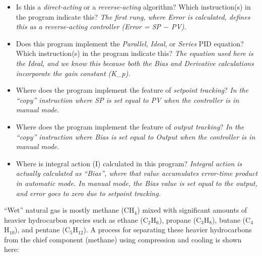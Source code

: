 \begin{itemize}
\item{} Is this a {\it direct-acting} or a {\it reverse-acting} algorithm?  Which instruction(s) in the program indicate this? {\it The first rung, where Error is calculated, defines this as a reverse-acting controller (Error = SP $-$ PV).}
\vskip 10pt
\item{} Does this program implement the {\it Parallel}, {\it Ideal}, or {\it Series} PID equation?  Which instruction(s) in the program indicate this?  {\it The equation used here is the Ideal, and we know this because both the Bias and Derivative calculations incorporate the gain constant (K\_p).}
\vskip 10pt
\item{} Where does the program implement the feature of {\it setpoint tracking}?  {\it In the ``copy'' instruction where SP is set equal to PV when the controller is in manual mode.}
\vskip 10pt
\item{} Where does the program implement the feature of {\it output tracking}?  {\it In the ``copy'' instruction where Bias is set equal to Output when the controller is in manual mode.}
\vskip 10pt
\item{} Where is integral action (I) calculated in this program?  {\it Integral action is actually calculated as ``Bias'', where that value accumulates error-time product in automatic mode.  In manual mode, the Bias value is set equal to the output, and error goes to zero due to setpoint tracking.}
\end{itemize}






``Wet'' natural gas is mostly methane (CH$_{4}$) mixed with significant amounts of heavier hydrocarbon species such as ethane (C$_{2}$H$_{6}$), propane (C$_{3}$H$_{8}$), butane (C$_{4}$H$_{10}$), and pentane (C$_{5}$H$_{12}$).  A process for separating these heavier hydrocarbons from the chief component (methane) using compression and cooling is shown here:

